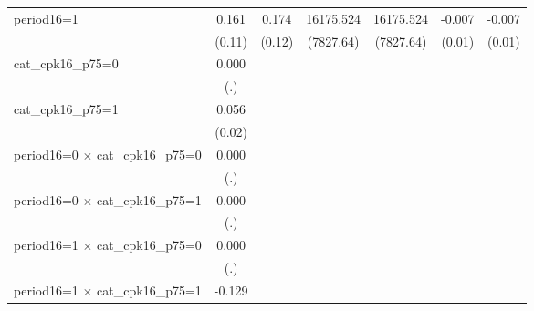 {\begin{tabular}{l*{6}{c}}
period16=1          &       0.161         &       0.174         &   16175.524\sym{*}  &   16175.524\sym{*}  &      -0.007         &      -0.007         \\
                    &      (0.11)         &      (0.12)         &   (7827.64)         &   (7827.64)         &      (0.01)         &      (0.01)         \\
cat\_cpk16\_p75=0     &       0.000         &                     &                     &                     &                     &                     \\
                    &         (.)         &                     &                     &                     &                     &                     \\
cat\_cpk16\_p75=1     &       0.056\sym{**} &                     &                     &                     &                     &                     \\
                    &      (0.02)         &                     &                     &                     &                     &                     \\
period16=0 $\times$ cat\_cpk16\_p75=0&       0.000         &                     &                     &                     &                     &                     \\
                    &         (.)         &                     &                     &                     &                     &                     \\
period16=0 $\times$ cat\_cpk16\_p75=1&       0.000         &                     &                     &                     &                     &                     \\
                    &         (.)         &                     &                     &                     &                     &                     \\
period16=1 $\times$ cat\_cpk16\_p75=0&       0.000         &                     &                     &                     &                     &                     \\
                    &         (.)         &                     &                     &                     &                     &                     \\
period16=1 $\times$ cat\_cpk16\_p75=1&      -0.129\sym{***}&                     &                     &                     &                     &                     \\

\end{tabular}}
